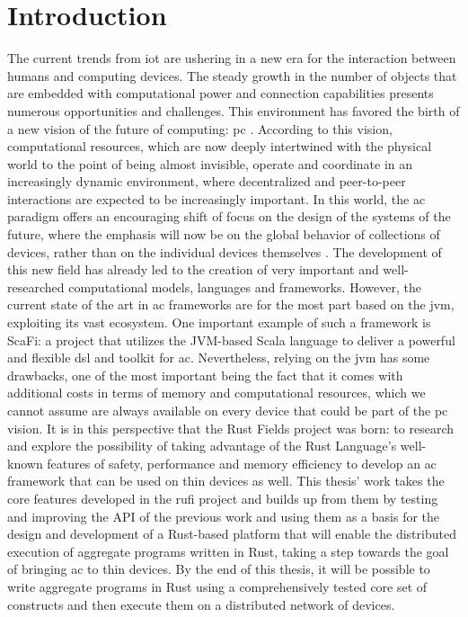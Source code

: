 
\chapter{Introduction}
\label{chap:introduction}
The current trends from \ac{iot} are ushering in a new era for the interaction between humans and computing devices. The steady growth in the number of objects that are embedded with computational power
and connection capabilities presents numerous opportunities and challenges. This environment has favored the birth of a new vision of the future of computing: \ac{pc} \cite{satyanarayanan2001pervasive}.
According to this vision, computational resources, which are now deeply intertwined with the physical world to the point of being almost invisible, operate and coordinate in an increasingly
dynamic environment, where decentralized and peer-to-peer interactions are expected to be increasingly important. In this world, the \ac{ac} paradigm offers an encouraging shift of focus on the design
of the systems of the future, where the emphasis will now be on the global behavior of collections of devices, rather than on the individual devices themselves \cite{7274429}.
The development of this new field has already led to the creation of very important and well-researched computational models, languages and frameworks. However, the current state of the art in \ac{ac}
frameworks are for the most part based on the \ac{jvm}, exploiting its vast ecosystem. One important example of such a framework is ScaFi: a project that utilizes the JVM-based Scala language
to deliver a powerful and flexible \ac{dsl} and toolkit for \ac{ac}. Nevertheless, relying on the \ac{jvm} has some drawbacks, one of the most important being the fact that it comes with additional costs in terms
of memory and computational resources, which we cannot assume are always available on every device that could be part of the \ac{pc} vision. It is in this perspective that the Rust Fields project was born: to
research and explore the possibility of taking advantage of the Rust Language's well-known features of safety, performance and memory efficiency to develop an \ac{ac} framework that can be used on thin devices as well.
This thesis' work takes the core features developed in the \ac{rufi} project and builds up from them by testing and improving the API of the previous work and using them as a basis for the design and development of a Rust-based platform that will enable the distributed execution of aggregate programs written in Rust,
taking a step towards the goal of bringing \ac{ac} to thin devices.
By the end of this thesis, it will be possible to write aggregate programs in Rust using a comprehensively tested core set of constructs and then execute them on a distributed network of devices.

